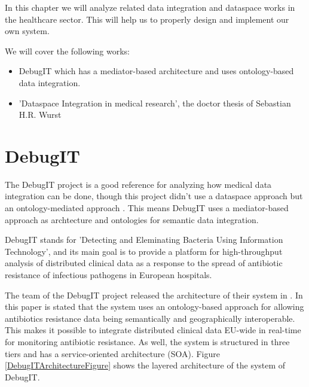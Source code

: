 In this chapter we will analyze related data integration and dataspace works in the healthcare sector. This will help us to properly design and implement our own system.

We will cover the following works:

\begin{itemize}
\item DebugIT which has a mediator-based architecture and uses ontology-based data integration.
\item 'Dataspace Integration in medical research', the doctor thesis of Sebastian H.R. Wurst
\end{itemize}

\section{DebugIT}
The DebugIT project is a good reference for analyzing how medical data integration can be done, though this project didn't use a dataspace approach but an ontology-mediated approach \cite{WurstDiss, DBLP:books/dp/LeserN2006}. This means DebugIT uses a mediator-based approach as archtecture and ontologies for semantic data integration.

DebugIT stands for 'Detecting and Eleminating Bacteria Using Information Technology', and its main goal is to provide a platform for high-throughput analysis of distributed clinical data as a response to the spread of antibiotic resistance of infectious pathogens in European hospitals\cite{UniFreiburgDebugITInfo}. 

The team of the DebugIT project released the architecture of their system in \cite{DBLP:conf/swat4ls/SchoberCDEDJTPLB14}.
In this paper is stated that the system uses an ontology-based approach for allowing antibiotics resistance data being semantically and geographically interoperable. This makes it possible to integrate distributed clinical data EU-wide in real-time for monitoring antibiotic resistance. As well, the system is structured in three tiers and has a service-oriented architecture (SOA). Figure \ref{DebugITArchitectureFigure} shows the layered architecture of the system of DebugIT.

